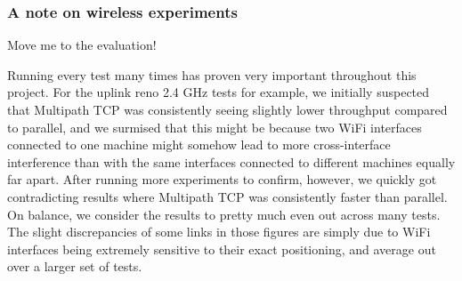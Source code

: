 \subsubsection{A note on wireless experiments}
Move me to the evaluation!

Running every test many times has proven very important throughout this project.
For the uplink reno 2.4 GHz tests for example, we initially suspected that
Multipath TCP was consistently seeing slightly lower throughput compared to
parallel, and we surmised that this might be because two WiFi interfaces
connected to one machine might somehow lead to more cross-interface interference
than with the same interfaces connected to different machines equally far apart.
After running more experiments to confirm, however, we quickly got contradicting
results where Multipath TCP was consistently faster than parallel. On balance,
we consider the results to pretty much even out across many tests. The slight
discrepancies of some links in those figures are simply due to WiFi interfaces
being extremely sensitive to their exact positioning, and average out over a
larger set of tests.
